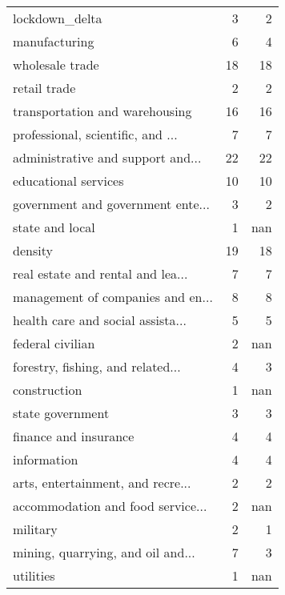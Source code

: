\begin{tabular}{lrr}
\hline
 lockdown\_delta                    &  3 &   2 \\
 manufacturing                     &  6 &   4 \\
 wholesale trade                   & 18 &  18 \\
 retail trade                      &  2 &   2 \\
 transportation and warehousing    & 16 &  16 \\
 professional, scientific, and ... &  7 &   7 \\
 administrative and support and... & 22 &  22 \\
 educational services              & 10 &  10 \\
 government and government ente... &  3 &   2 \\
 state and local                   &  1 & nan \\
 density                           & 19 &  18 \\
 real estate and rental and lea... &  7 &   7 \\
 management of companies and en... &  8 &   8 \\
 health care and social assista... &  5 &   5 \\
 federal civilian                  &  2 & nan \\
 forestry, fishing, and related... &  4 &   3 \\
 construction                      &  1 & nan \\
 state government                  &  3 &   3 \\
 finance and insurance             &  4 &   4 \\
 information                       &  4 &   4 \\
 arts, entertainment, and recre... &  2 &   2 \\
 accommodation and food service... &  2 & nan \\
 military                          &  2 &   1 \\
 mining, quarrying, and oil and... &  7 &   3 \\
 utilities                         &  1 & nan \\
\hline
\end{tabular}
